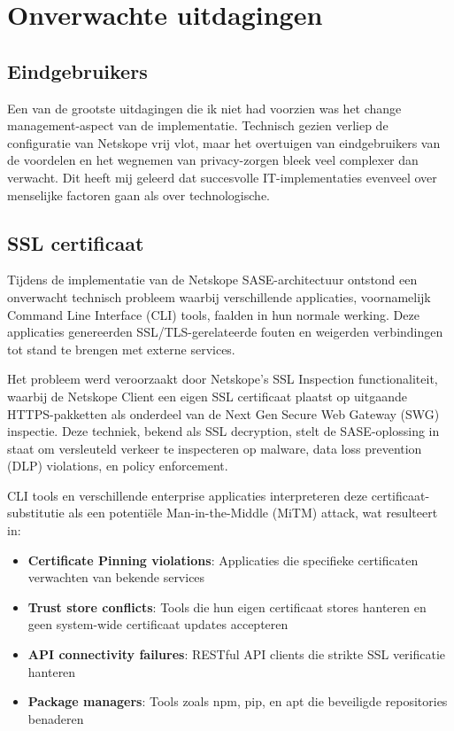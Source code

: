 \section{Onverwachte uitdagingen}
\subsection{Eindgebruikers}
Een van de grootste uitdagingen die ik niet had voorzien was het change management-aspect van de implementatie. Technisch gezien verliep de configuratie van Netskope vrij vlot, maar het overtuigen van eindgebruikers van de voordelen en het wegnemen van privacy-zorgen bleek veel complexer dan verwacht. Dit heeft mij geleerd dat succesvolle IT-implementaties evenveel over menselijke factoren gaan als over technologische.

\subsection{SSL certificaat}
Tijdens de implementatie van de Netskope SASE-architectuur ontstond een onverwacht technisch probleem waarbij verschillende applicaties, voornamelijk Command Line Interface (CLI) tools, faalden in hun normale werking. Deze applicaties genereerden SSL/TLS-gerelateerde fouten en weigerden verbindingen tot stand te brengen met externe services.

\vspace{2ex}

Het probleem werd veroorzaakt door Netskope's SSL Inspection functionaliteit, waarbij de Netskope Client een eigen SSL certificaat plaatst op uitgaande HTTPS-pakketten als onderdeel van de Next Gen Secure Web Gateway (SWG) inspectie. Deze techniek, bekend als SSL decryption, stelt de SASE-oplossing in staat om versleuteld verkeer te inspecteren op malware, data loss prevention (DLP) violations, en policy enforcement.

\vspace{2ex}

CLI tools en verschillende enterprise applicaties interpreteren deze certificaat-substitutie als een potentiële Man-in-the-Middle (MiTM) attack, wat resulteert in:

\begin{itemize}
    \item \textbf{Certificate Pinning violations}: Applicaties die specifieke certificaten verwachten van bekende services
    \item \textbf{Trust store conflicts}: Tools die hun eigen certificaat stores hanteren en geen system-wide certificaat updates accepteren
    \item \textbf{API connectivity failures}: RESTful API clients die strikte SSL verificatie hanteren
    \item \textbf{Package managers}: Tools zoals npm, pip, en apt die beveiligde repositories benaderen
\end{itemize}

